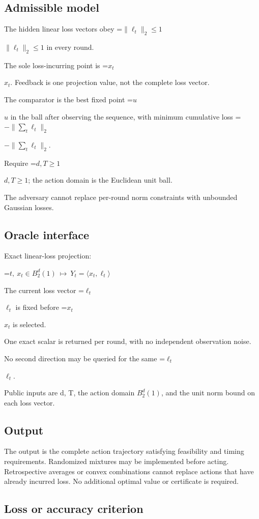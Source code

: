 \documentclass[10pt,a4paper]{article}
\newcommand{\AtlasMath}[1]{\par\begingroup\centering\setbox0=\hbox{$\displaystyle #1$}\ifdim\wd0>1.4\linewidth\typeout{ATLAS WIDE FORMULA: \the\wd0}\fi\ifdim\wd0>\linewidth\resizebox{\linewidth}{!}{\box0}\else\box0\fi\par\endgroup}
\newcommand{\AtlasInlineMath}[1]{\begingroup\setbox0=\hbox{$#1$}\ifdim\wd0>.4\linewidth\endgroup\AtlasMath{#1}\else\endgroup$#1$\fi}
\begin{document}
\subsection{Admissible model}
The hidden linear loss vectors obey \AtlasInlineMath{\|\ell_t\|_2\le1} in every round.

The sole loss-incurring point is \AtlasInlineMath{x_t}. Feedback is one projection value, not the complete loss vector.

The comparator is the best fixed point \AtlasInlineMath{u} in the ball after observing the sequence, with minimum cumulative loss \AtlasInlineMath{-\|\sum_t\ell_t\|_2}.

Require \AtlasInlineMath{d,T\ge1}; the action domain is the Euclidean unit ball.

The adversary cannot replace per-round norm constraints with unbounded Gaussian losses.

\subsection{Oracle interface}
Exact linear-loss projection:


\AtlasMath{t,\ x_t\in B_2^d(1)\ \longmapsto\ Y_t=\langle x_t,\ell_t\rangle}


The current loss vector \AtlasInlineMath{\ell_t} is fixed before \AtlasInlineMath{x_t} is selected.

One exact scalar is returned per round, with no independent observation noise.

No second direction may be queried for the same \AtlasInlineMath{\ell_t}.

Public inputs are d, T, the action domain $B_2^{d}(1)$, and the unit norm bound on each loss vector.

\subsection{Output}
The output is the complete action trajectory satisfying feasibility and timing requirements. Randomized mixtures may be implemented before acting. Retrospective averages or convex combinations cannot replace actions that have already incurred loss. No additional optimal value or certificate is required.

\subsection{Loss or accuracy criterion}
\end{document}
